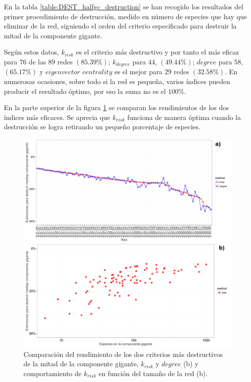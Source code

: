 En la tabla \ref{table:DEST_halfgc_destruction} se han recogido los resultados del primer procedimiento de destrucción, medido en número de especies que hay que eliminar de la red, siguiendo el orden del criterio especificado para destruir la mitad de la componente gigante.

Según estos datos, $k_{risk}$ es el criterio más destructivo y por tanto el más eficaz para $76$ de las $89$ redes $(85.39\%)$; $k_{degree}$ para $44$, $(49.44\%)$; $degree$ para $58$, $(65.17\%)$ y
$eigenvector$ $centrality$ es el mejor para $29$ redes $(32.58\%)$. En numerosas ocasiones, sobre todo si la red es pequeña, varios índices pueden producir el
resultado óptimo, por eso la suma no es el $100\%$.

En la parte superior de la figura \ref{fig:DEST_krisk_kdegree_comparison_ES} se comparan los rendimientos de los dos índices más eficaces. Se aprecia que ${k}_{risk}$ funciona de manera óptima cuando la destrucción se logra retirando un pequeño porcentaje de especies.

\clearpage
\begin{figure}[h!]
\centering
\includegraphics[scale=0.55]{Figures/DEST_krisk_kdegree_comparison_ES.png}
\caption {Comparación del rendimiento de los dos criterios más destructivos de la mitad de la componente gigante, $k_{risk}$ y $degree$ (b) y comportamiento de ${k}_{risk}$ en función del tamaño de la red (b).}
\label{fig:DEST_krisk_kdegree_comparison_ES}
\end{figure}

